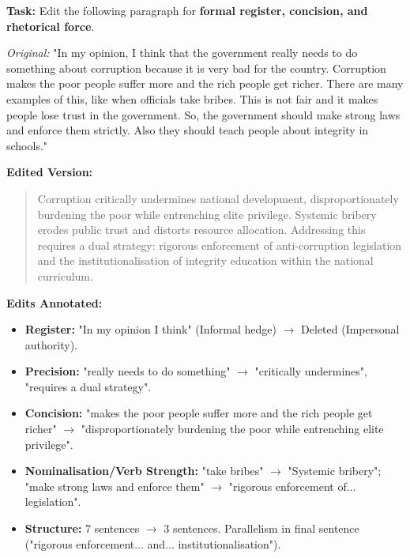 \documentclass[11pt]{article}
\newcommand{\cle}[1]{{\popxbold\color{popdark}#1}}
\newcounter{popsec}
\newcounter{popsub}
\newcommand{\courssub}[1]{%
  \stepcounter{popsub}%
  \par\vspace{9pt}\noindent{\popxbold\fontsize{11.5}{13}\selectfont\color{popink}{\color{poporange}\thepopsec.\thepopsub}\hspace{6pt}#1}\par\nopagebreak\vspace{4pt}
}
\begin{document}
\begin{exoresolu}
\textbf{Task:} Edit the following paragraph for \textbf{formal register, concision, and rhetorical force}.

\textit{Original:} "In my opinion, I think that the government really needs to do something about corruption because it is very bad for the country. Corruption makes the poor people suffer more and the rich people get richer. There are many examples of this, like when officials take bribes. This is not fair and it makes people lose trust in the government. So, the government should make strong laws and enforce them strictly. Also they should teach people about integrity in schools."

\tcblower
\textbf{Edited Version:}
\begin{quote}
Corruption critically undermines national development, disproportionately burdening the poor while entrenching elite privilege. Systemic bribery erodes public trust and distorts resource allocation. Addressing this requires a dual strategy: rigorous enforcement of anti-corruption legislation and the institutionalisation of integrity education within the national curriculum.
\end{quote}

\textbf{Edits Annotated:}
\begin{itemize}
    \item \textbf{Register:} "In my opinion I think" (Informal hedge) $\rightarrow$ Deleted (Impersonal authority).
    \item \textbf{Precision:} "really needs to do something" $\rightarrow$ "critically undermines", "requires a dual strategy".
    \item \textbf{Concision:} "makes the poor people suffer more and the rich people get richer" $\rightarrow$ "disproportionately burdening the poor while entrenching elite privilege".
    \item \textbf{Nominalisation/Verb Strength:} "take bribes" $\rightarrow$ "Systemic bribery"; "make strong laws and enforce them" $\rightarrow$ "rigorous enforcement of... legislation".
    \item \textbf{Structure:} 7 sentences $\rightarrow$ 3 sentences. \cle{Parallelism} in final sentence ("rigorous enforcement... and... institutionalisation").
\end{itemize}
\end{exoresolu}

\courssub{Euphemisms, Clichés, and Jargon}
\end{document}
